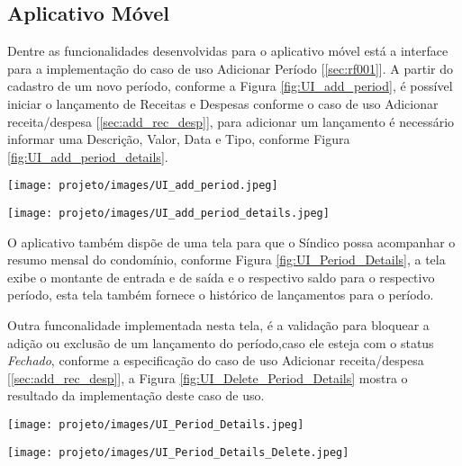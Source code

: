 \documentclass[12pt]{article}
\begin{document}
\subsection{Aplicativo Móvel}
\label{sec:app_mobile}
Dentre as funcionalidades desenvolvidas para o aplicativo móvel está a interface para a implementação do caso de uso Adicionar Período [\ref{sec:rf001}].
A partir do cadastro de um novo período, conforme a Figura \ref{fig:UI_add_period}, é possível iniciar o lançamento de Receitas e Despesas conforme o caso de uso Adicionar receita/despesa [\ref{sec:add_rec_desp}], para adicionar um lançamento é necessário informar uma Descrição, Valor, Data e Tipo, conforme Figura \ref{fig:UI_add_period_details}.

\begin{table*}[!ht]
    \begin{minipage}{.4\linewidth}
        \centering
        \texttt{[image: projeto/images/UI\_add\_period.jpeg]}
        \label{fig:UI_add_period}
    \end{minipage}
    \hfill
    \begin{minipage}{.4\linewidth}
        \centering
        \texttt{[image: projeto/images/UI\_add\_period\_details.jpeg]}
        \label{fig:UI_add_period_details}
    \end{minipage}
\end{table*}

O aplicativo também dispõe de uma tela para que o Síndico possa acompanhar o resumo mensal do condomínio, conforme Figura \ref{fig:UI_Period_Details}, a tela  exibe o montante de entrada e de saída e o respectivo saldo para o respectivo período, esta tela também fornece o histórico de lançamentos para o período.

Outra funconalidade implementada nesta tela, é a validação para bloquear a adição ou exclusão de um lançamento do período,caso ele esteja com o status \emph{Fechado}, conforme a especificação do caso de uso Adicionar receita/despesa [\ref{sec:add_rec_desp}], a Figura \ref{fig:UI_Delete_Period_Details} mostra o resultado da implementação deste caso de uso.

\begin{table*}[!ht]
    \begin{minipage}{.4\linewidth}
        \centering
        \texttt{[image: projeto/images/UI\_Period\_Details.jpeg]}
        \label{fig:UI_Period_Details}
    \end{minipage}
    \hfill
    \begin{minipage}{.4\linewidth}
        \centering
        \texttt{[image: projeto/images/UI\_Period\_Details\_Delete.jpeg]}
        \label{fig:UI_Delete_Period_Details}
    \end{minipage}
\end{table*}
\end{document}
